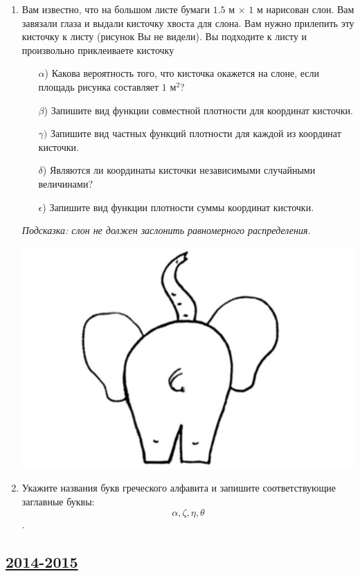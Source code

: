 \begin{enumerate}
\item
Вам известно, что на большом листе бумаги $1.5$ м $\times$ $1$ м нарисован слон. Вам завязали
глаза и выдали кисточку хвоста для слона. Вам нужно прилепить эту кисточку к
листу (рисунок Вы не видели). Вы подходите к листу и произвольно приклеиваете
кисточку
\begin{enumerate}
    \item[$\alpha$)] Какова вероятность того, что кисточка окажется на слоне,
    если площадь рисунка составляет $1$ м$^2$?
    \item[$\beta$)] Запишите вид функции совместной плотности для координат кисточки.
    \item[$\gamma)$] Запишите вид частных функций плотности для каждой из координат кисточки.
    \item[$\delta$)] Являются ли координаты кисточки независимыми случайными величинами?
    \item[$\epsilon$)] Запишите вид функции плотности суммы координат кисточки.
\end{enumerate}
\textit{Подсказка: слон не должен заслонить равномерного распределения.}

\begin{center}
\includegraphics[scale=1.5]{images/slon.jpg}
\end{center}

\item
Укажите названия букв греческого алфавита и запишите соответствующие заглавные буквы:
\[\alpha, \zeta, \eta, \theta\].

\end{enumerate}



\newpage
\subsection[2014-2015]{\hyperref[sec:sol_kr_01_2014_2015]{2014-2015}}
\label{sec:kr_01_2014_2015}

